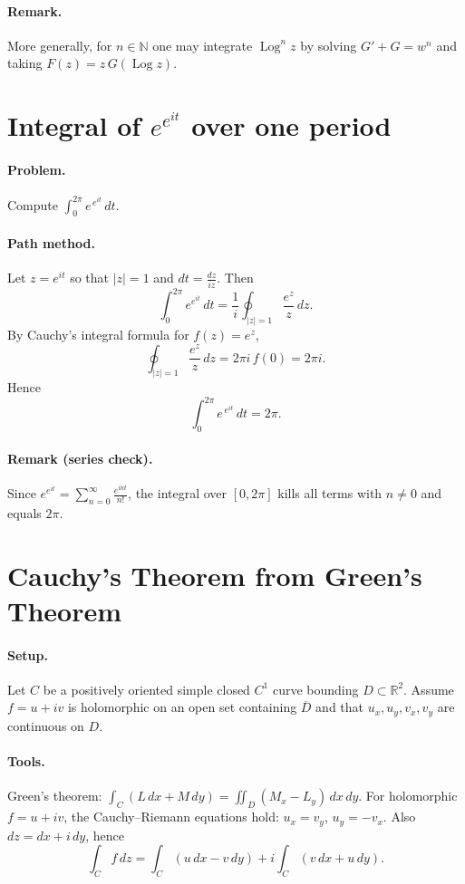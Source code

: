 \documentclass[11pt]{article}
\DeclareMathOperator{\Log}{Log}
\begin{document}
	\paragraph{Remark.}
	More generally, for $n\in\mathbb N$ one may integrate $\Log^{n}z$ by solving
	$G'+G=w^{n}$ and taking $F(z)=z\,G(\Log z)$.
	
	
\section*{Integral of $e^{e^{it}}$ over one period}

\paragraph{Problem.}
Compute $\displaystyle \int_{0}^{2\pi} e^{\,e^{it}}\,dt$.

\paragraph{Path method.}
Let $z=e^{it}$ so that $|z|=1$ and $dt=\frac{dz}{iz}$. Then
\[
\int_{0}^{2\pi} e^{e^{it}}\,dt
=\frac1i\oint_{|z|=1}\frac{e^{z}}{z}\,dz.
\]
By Cauchy’s integral formula for $f(z)=e^{z}$,
\[
\oint_{|z|=1}\frac{e^{z}}{z}\,dz=2\pi i\,f(0)=2\pi i.
\]
Hence
\[
\boxed{\displaystyle \int_{0}^{2\pi} e^{\,e^{it}}\,dt=2\pi }.
\]

\paragraph{Remark (series check).}
Since $e^{e^{it}}=\sum_{n=0}^\infty \frac{e^{int}}{n!}$, the integral over $[0,2\pi]$
kills all terms with $n\neq0$ and equals $2\pi$.


\section*{Cauchy’s Theorem from Green’s Theorem}

\paragraph{Setup.}
Let $C$ be a positively oriented simple closed $C^1$ curve bounding $D\subset\mathbb R^2$.
Assume $f=u+iv$ is holomorphic on an open set containing $\overline D$ and that
$u_x,u_y,v_x,v_y$ are continuous on $D$.

\paragraph{Tools.}
Green’s theorem: $\displaystyle \int_C (L\,dx+M\,dy)=\iint_D (M_x-L_y)\,dx\,dy$.
For holomorphic $f=u+iv$, the Cauchy--Riemann equations hold:
$u_x=v_y$, $u_y=-v_x$.
Also $dz=dx+i\,dy$, hence
\[
\int_C f\,dz=\int_C (u\,dx-v\,dy)+i\int_C (v\,dx+u\,dy).
\]
\end{document}
